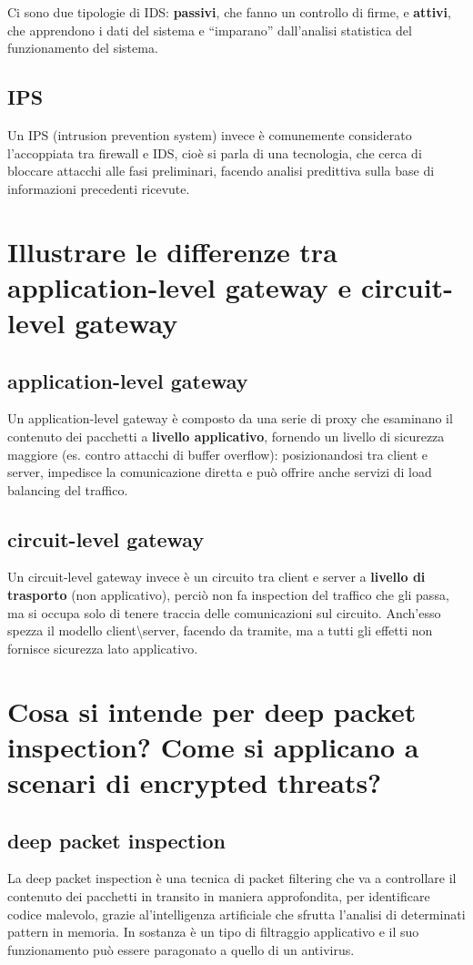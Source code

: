 \documentclass{report}
\begin{document}
\noindent Ci sono due tipologie di IDS: \textbf{passivi}, che fanno un controllo di firme, e \textbf{attivi}, che apprendono i dati del sistema e “imparano” dall’analisi statistica del funzionamento del sistema.

\subsection{IPS}
Un IPS (intrusion prevention system) invece è comunemente considerato l'accoppiata tra firewall e IDS, cioè si parla di una tecnologia, 
che cerca di bloccare attacchi alle fasi preliminari, facendo analisi predittiva sulla base di informazioni precedenti ricevute.

\section{Illustrare le differenze tra application-level gateway e circuit-level gateway}
\subsection{application-level gateway}
Un application-level gateway è composto da una serie di proxy che esaminano il contenuto dei pacchetti a \textbf{livello applicativo}, fornendo un livello di sicurezza maggiore (es. contro attacchi di buffer overflow): 
posizionandosi tra client e server, impedisce la comunicazione diretta e può offrire anche servizi di load balancing del traffico.

\subsection{circuit-level gateway}
Un circuit-level gateway invece è un circuito tra client e server a  \textbf{livello di trasporto} (non applicativo), perciò non fa inspection del traffico che gli passa, ma si occupa solo di tenere traccia delle comunicazioni sul circuito. 
Anch'esso spezza il modello client\textbackslash server, facendo da tramite, ma a tutti gli effetti non fornisce sicurezza lato applicativo.

\section{Cosa si intende per deep packet inspection? Come si applicano a scenari di encrypted threats?}
\subsection{deep packet inspection}
La deep packet inspection è una tecnica di packet filtering che va a controllare il contenuto dei pacchetti in transito in maniera approfondita, per identificare codice malevolo, grazie al'intelligenza artificiale che sfrutta l'analisi
di determinati pattern in memoria. In sostanza è un tipo di filtraggio applicativo e il suo funzionamento può essere paragonato a quello di un antivirus.
\end{document}
